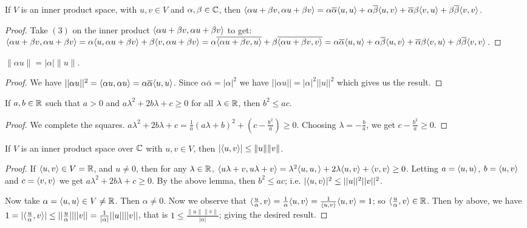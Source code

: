 \begin{lemma}\label{1.4.1}
    If $V$ is an inner product space, with  $u,v \in V$ and  $\alpha,\beta \in \mathbb{C}$, then
    $\langle \alpha u+\beta v, \alpha u+\beta
    v\rangle=\alpha\overline{\alpha}\langle u,u\rangle+\alpha\overline{\beta}\langle u,v\rangle+\overline{\alpha}\beta\langle v,u\rangle+\beta\overline{\beta}\langle v,v\rangle$.
\end{lemma}
\begin{proof}
    Take $(3)$ on the inner product $\langle \alpha u+\beta v, \alpha u+\beta v\rangle$ to get: 
    $\langle \alpha u+\beta v, \alpha u+\beta v\rangle=\alpha\langle u,\alpha u+\beta v\rangle+\beta\langle v,
    \alpha u+\beta v\rangle=\alpha\overline{\langle \alpha u+\beta v,u\rangle}+\beta\overline{\langle \alpha u+\beta
v,v\rangle}=\alpha\overline{\alpha}\langle u,u\rangle+\alpha\overline{\beta}\langle u,v\rangle+\overline{\alpha}\beta\langle v,u\rangle+\beta\overline{\beta}\langle v,v\rangle$.
\end{proof}
\begin{corollary}
    $\|\alpha u\|=|\alpha|\|u\|.$
\end{corollary}
\begin{proof}
    We have $||\alpha u||^2=\langle \alpha u, \alpha u\rangle=\alpha\overline{\alpha}\langle u,u\rangle$. Since
    $\alpha\bar{\alpha}=|\alpha|^2$ we have $||\alpha u||=|\alpha|^2||u||^2$ which gives us the
    result.
\end{proof}

\begin{lemma}\label{1.4.2}
    If $a,b \in \mathbb{R}$ such that $a>0$ and  $a\lambda^2+2b\lambda+c \geq 0$ for all  $\lambda \in \mathbb{R}$,
    then  $b^2 \leq ac$.
\end{lemma}
\begin{proof}
    We complete the squares. $a\lambda^2+2b\lambda+c=\frac{1}{a}(a\lambda+b)^2+(c-\frac{b^2}{a})
    \geq 0$. Choosing $\lambda=-\frac{b}{a}$, we get $c-\frac{b^2}{a} \geq 0$.
\end{proof}

\begin{theorem}\label{1.4.3}
    If $V$ is an inner product space over  $\mathbb{C}$ with $u,v \in V$, then  $|\langle u,v\rangle| \leq
    \|u\|\|v\|$.
\end{theorem}
\begin{proof}
    If $\langle u,v\rangle \in V=\mathbb{R}$, and $u \neq 0$, then for any  $\lambda \in \mathbb{R}$,
    $\langle u\lambda+v,u\lambda+v\rangle=\lambda^2\langle u,u,\rangle+2\lambda\langle u,v\rangle+\langle v,v\rangle \geq
    0$. Letting $a=\langle u,u\rangle$, $b=\langle u,v\rangle$ and $c=\langle v,v\rangle$ we get
    $a\lambda^2+2b\lambda+c \geq 0$. By the above lemma, then  $b^2 \leq ac$; i.e.
    $|\langle u,v\rangle|^2 \leq ||u||^2||v||^2$.

    Now take $\alpha=\langle u,u\rangle \in V \neq \mathbb{R}$. Then $\alpha \neq 0$. Now we observe that
    $\langle \frac{u}{\alpha},v\rangle=\frac{1}{\alpha}\langle u,v\rangle=\frac{1}{\langle u,v\rangle}\langle u,v\rangle=1$;
    so $\langle \frac{u}{\alpha},v\rangle \in \mathbb{R}$. Then by above, we have $1=|\langle \frac{u}{\alpha},v\rangle|
    \leq ||\frac{u}{\alpha}||||v||=\frac{1}{|\alpha|}||u||||v||$, that is $1 \leq
    \frac{\|u\|\|v\|}{|\alpha|}$; giving the desired result.
\end{proof}

